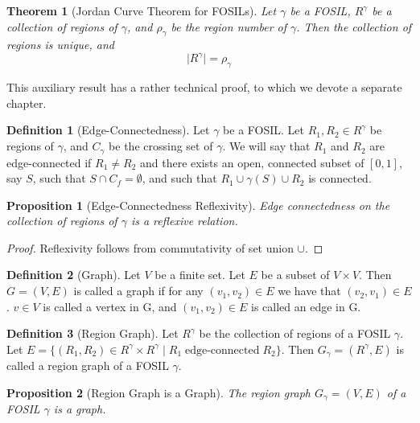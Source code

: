 \documentclass{article}
\theoremstyle{definition}
\newtheorem{definition}{Definition}
\theoremstyle{definition}
\theoremstyle{plain}
\newtheorem{proposition}{Proposition}
\newtheorem{theorem}{Theorem}
\begin{document}
\begin{theorem}[Jordan Curve Theorem for FOSILs]
Let $\gamma$ be a FOSIL, $R^{\gamma}$ be a collection of regions of $\gamma$, and $\rho_{\gamma}$ be the region number of $\gamma$. Then the collection of regions is unique, and $$\lvert R^{\gamma}\rvert = \rho_{\gamma}$$
\end{theorem}

This auxiliary result has a rather technical proof, to which we devote a separate chapter.

\begin{definition}[Edge-Connectedness]
Let $\gamma$ be a FOSIL. Let $R_{1}, R_{2} \in R^{\gamma}$ be regions of $\gamma$, and $C_{\gamma}$ be the crossing set of $\gamma$. We will say that $R_{1}$ and $R_{2}$ are edge-connected if $R_{1} \neq R_{2}$ and there exists an open, connected subset of $[0, 1]$, say $S$, such that $S \cap C_{f} = \emptyset$, and such that $R_{1} \cup \gamma(S) \cup R_{2}$ is connected.
\end{definition}

\begin{proposition}[Edge-Connectedness Reflexivity]
Edge connectedness on the collection of regions of $\gamma$ is a reflexive relation.
\end{proposition}

\begin{proof}
Reflexivity follows from commutativity of set union $\cup$.
\end{proof}

\begin{definition}[Graph]
Let $V$ be a finite set. Let $E$ be a subset of $V\times V$. Then $G=(V, E)$ is called a graph if for any $(v_{1}, v_{2}) \in E$ we have that $(v_{2}, v_{1}) \in E$. $v \in V$ is called a vertex in G, and $(v_{1}, v_{2}) \in E$ is called an edge in G.
\end{definition}

\begin{definition}[Region Graph]
Let $R^{\gamma}$ be the collection of regions of a FOSIL $\gamma$. Let $E = \{(R_{1}, R_{2}) \in R^{\gamma} \times R^{\gamma} \mid R_{1} \operatorname{edge-connected} R_{2}\}$. Then $G_{\gamma}=(R^{\gamma},E)$ is called a region graph of a FOSIL $\gamma$.
\end{definition}

\begin{proposition}[Region Graph is a Graph]
The region graph $G_{\gamma} = (V, E)$ of a FOSIL $\gamma$ is a graph.
\end{proposition}
\end{document}
